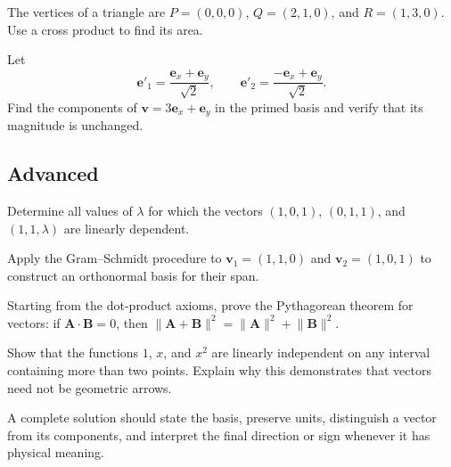 \begin{chapterexercise}
The vertices of a triangle are $P=(0,0,0)$, $Q=(2,1,0)$, and $R=(1,3,0)$.
Use a cross product to find its area.
\end{chapterexercise}

\begin{chapterexercise}
Let
\[
\mathbf e'_1=\frac{\mathbf e_x+\mathbf e_y}{\sqrt2},\qquad
\mathbf e'_2=\frac{-\mathbf e_x+\mathbf e_y}{\sqrt2}.
\]
Find the components of $\mathbf v=3\mathbf e_x+\mathbf e_y$ in the primed basis
and verify that its magnitude is unchanged.
\end{chapterexercise}

\subsection*{Advanced}

\begin{chapterexercise}
Determine all values of $\lambda$ for which the vectors
$(1,0,1)$, $(0,1,1)$, and $(1,1,\lambda)$ are linearly dependent.
\end{chapterexercise}

\begin{chapterexercise}[Orthonormalization]
Apply the Gram--Schmidt procedure to $\mathbf v_1=(1,1,0)$ and
$\mathbf v_2=(1,0,1)$ to construct an orthonormal basis for their span.
\end{chapterexercise}

\begin{chapterexercise}
Starting from the dot-product axioms, prove the Pythagorean theorem for vectors:
if $\mathbf A\cdot\mathbf B=0$, then
$\lVert\mathbf A+\mathbf B\rVert^2
=\lVert\mathbf A\rVert^2+\lVert\mathbf B\rVert^2$.
\end{chapterexercise}

\begin{chapterexercise}
Show that the functions $1$, $x$, and $x^2$ are linearly independent on any
interval containing more than two points. Explain why this demonstrates that
vectors need not be geometric arrows.
\end{chapterexercise}

\begin{bookinsight}
A complete solution should state the basis, preserve units, distinguish a
vector from its components, and interpret the final direction or sign whenever
it has physical meaning.
\end{bookinsight}

